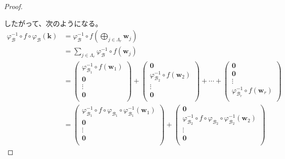 \documentclass[dvipdfmx]{jsarticle}
\begin{document}
\begin{proof}
\begin{center}
\begin{tikzpicture}[auto]
  \end{tikzpicture} 
\end{center}
したがって、次のようになる。
\begin{align*}
\varphi_{\mathcal{B}}^{- 1} \circ f \circ \varphi_{\mathcal{B}}\left( \mathbf{k} \right) &= \varphi_{\mathcal{B}}^{- 1} \circ f\left( \bigoplus_{j \in \varLambda_{r}} \mathbf{w}_{j} \right)\\
&= \sum_{j \in \varLambda_{r}} {\varphi_{\mathcal{B}}^{- 1} \circ f\left( \mathbf{w}_{j} \right)}\\
&= \begin{pmatrix}
\varphi_{\mathcal{B}_{1}}^{- 1} \circ f\left( \mathbf{w}_{1} \right) \\
\mathbf{0} \\
 \vdots \\
\mathbf{0} \\
\end{pmatrix} + \begin{pmatrix}
\mathbf{0} \\
\varphi_{\mathcal{B}_{2}}^{- 1} \circ f\left( \mathbf{w}_{2} \right) \\
 \vdots \\
\mathbf{0} \\
\end{pmatrix} + \cdots + \begin{pmatrix}
\mathbf{0} \\
\mathbf{0} \\
 \vdots \\
\varphi_{\mathcal{B}_{r}}^{- 1} \circ f\left( \mathbf{w}_{r} \right) \\
\end{pmatrix}\\
&= \begin{pmatrix}
\varphi_{\mathcal{B}_{1}}^{- 1} \circ f \circ \varphi_{\mathcal{B}_{1}} \circ \varphi_{\mathcal{B}_{1}}^{- 1}\left( \mathbf{w}_{1} \right) \\
\mathbf{0} \\
 \vdots \\
\mathbf{0} \\
\end{pmatrix} + \begin{pmatrix}
\mathbf{0} \\
\varphi_{\mathcal{B}_{2}}^{- 1} \circ f \circ \varphi_{\mathcal{B}_{2}} \circ \varphi_{\mathcal{B}_{2}}^{- 1}\left( \mathbf{w}_{2} \right) \\
 \vdots \\
\mathbf{0} \\

\end{pmatrix}
\end{align*}
\end{proof}
\end{document}
